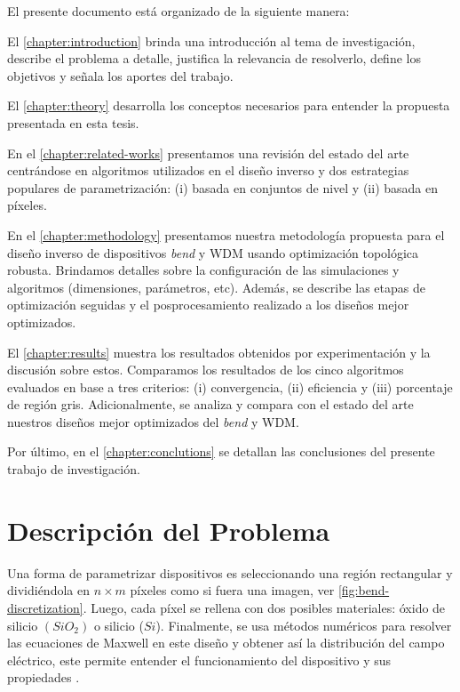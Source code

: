 El presente documento está organizado de la siguiente manera:

El \autoref{chapter:introduction}  brinda una introducción al tema de investigación, describe el problema a detalle, justifica la relevancia de resolverlo, define los objetivos y señala los aportes del trabajo.

El \autoref{chapter:theory} desarrolla los conceptos necesarios para entender la propuesta presentada
en esta tesis.

En el \autoref{chapter:related-works} presentamos una revisión del estado del arte centrándose
en algoritmos utilizados en el diseño inverso y dos estrategias populares de parametrización:
(i) basada en conjuntos de nivel y (ii) basada en píxeles.


En el \autoref{chapter:methodology} presentamos nuestra metodología propuesta para el diseño inverso de dispositivos \emph{bend} y WDM usando optimización topológica robusta. 
Brindamos detalles sobre la configuración
de las simulaciones y algoritmos (dimensiones, parámetros, etc).
Además, se describe las etapas de optimización seguidas y el posprocesamiento realizado a los diseños mejor optimizados.


El \autoref{chapter:results} muestra los resultados obtenidos por  experimentación y la discusión sobre estos.
Comparamos los resultados de los cinco algoritmos evaluados en base a tres criterios: 
(i) convergencia, (ii) eficiencia y (iii) porcentaje de región gris.
Adicionalmente, se analiza y compara con el estado del arte nuestros diseños mejor optimizados
del \emph{bend} y WDM.

Por último, en el \autoref{chapter:conclutions} se detallan las conclusiones del presente trabajo de investigación.

\section{Descripción del Problema}

Una forma de parametrizar dispositivos es seleccionando una región rectangular y dividiéndola
en $n \times m$ píxeles como si fuera una imagen, ver \autoref{fig:bend-discretization}.
Luego, cada píxel se rellena con dos posibles materiales: óxido de silicio $(SiO_2)$ o silicio ($Si$).
Finalmente, se usa métodos numéricos para resolver las ecuaciones de Maxwell en este diseño
y obtener así la distribución del campo eléctrico, este permite entender el funcionamiento del dispositivo
y sus propiedades \citep{Molesky2018, Schneider2019}.

